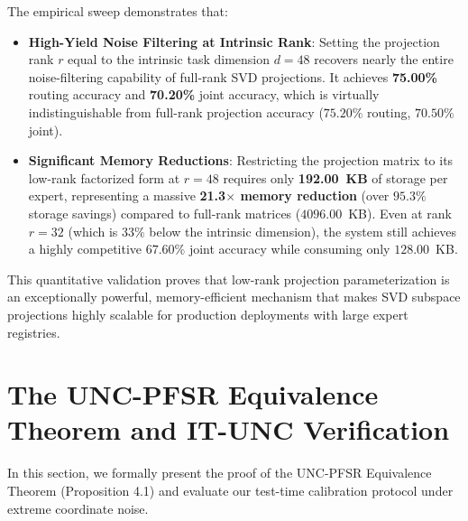 \documentclass{article}
\theoremstyle{plain}
\theoremstyle{definition}
\theoremstyle{remark}
\begin{document}
The empirical sweep demonstrates that:
\begin{itemize}
    \item \textbf{High-Yield Noise Filtering at Intrinsic Rank}: Setting the projection rank $r$ equal to the intrinsic task dimension $d=48$ recovers nearly the entire noise-filtering capability of full-rank SVD projections. It achieves \textbf{75.00\%} routing accuracy and \textbf{70.20\%} joint accuracy, which is virtually indistinguishable from full-rank projection accuracy ($75.20\%$ routing, $70.50\%$ joint).
    \item \textbf{Significant Memory Reductions}: Restricting the projection matrix to its low-rank factorized form at $r=48$ requires only \textbf{192.00~KB} of storage per expert, representing a massive \textbf{21.3$\times$ memory reduction} (over $95.3\%$ storage savings) compared to full-rank matrices ($4096.00$~KB). Even at rank $r=32$ (which is $33\%$ below the intrinsic dimension), the system still achieves a highly competitive $67.60\%$ joint accuracy while consuming only $128.00$~KB.
\end{itemize}
This quantitative validation proves that low-rank projection parameterization is an exceptionally powerful, memory-efficient mechanism that makes SVD subspace projections highly scalable for production deployments with large expert registries.

\section{The UNC-PFSR Equivalence Theorem and IT-UNC Verification}
\label{app:unc_equivalence}

In this section, we formally present the proof of the UNC-PFSR Equivalence Theorem (Proposition 4.1) and evaluate our test-time calibration protocol under extreme coordinate noise.
\end{document}
